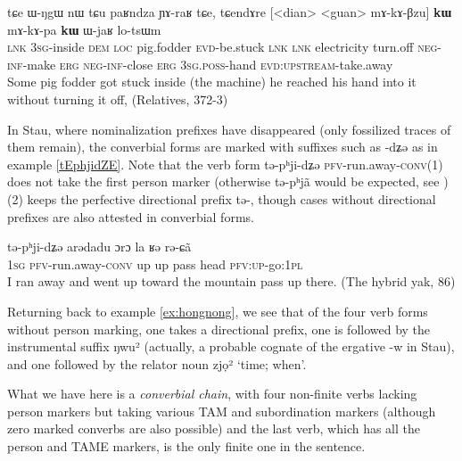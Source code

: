 \documentclass[oldfontcommands,oneside,a4paper,11pt]{article}
\newcommand{\ipa}[1]{{\phon \mbox{#1}}} %
\begin{document}
\begin{exe}
\ex \label{ex:mAkApa.kW}
\gll
\ipa{tɕe}   	\ipa{ɯ-ŋgɯ}   	\ipa{nɯ} \ipa{tɕu}   	\ipa{paʁndza}   	\ipa{ɲɤ-raʁ}   	\ipa{tɕe,}   	\ipa{tɕendɤre}   	[<dian>   	<guan>   	\ipa{mɤ-kɤ-βzu}] 	\ipa{\textbf{kɯ}}   	\ipa{mɤ-kɤ-pa}   	\ipa{\textbf{kɯ}}   	\ipa{ɯ-jaʁ}   	\ipa{lo-tsɯm}   \\
\textsc{lnk} \textsc{3sg}-inside \textsc{dem} \textsc{loc} pig.fodder \textsc{evd}-be.stuck \textsc{lnk}
\textsc{lnk} electricity turn.off \textsc{neg-inf}-make \textsc{erg}  \textsc{neg-inf}-close \textsc{erg}  \textsc{3sg.poss}-hand \textsc{evd:upstream}-take.away \\
\glt Some pig fodder got stuck inside (the machine) he reached his hand into it without turning it off, (Relatives, 372-3)
\end{exe} 

In Stau, where nominalization prefixes have disappeared (only  fossilized traces of them remain), the converbial forms are marked with suffixes such as \ipa{-dʑə} as in example \ref{tEphjidZE}. Note that the verb form \ipa{tə-pʰji-dʑə} \textsc{pfv}-run.away-\textsc{conv}(1) does not take the first person marker (otherwise \ipa{tə-pʰjã} would be expected, see \citealt{jacques14rtau}) (2) keeps the perfective directional prefix \ipa{tə-}, though cases without directional prefixes are also attested in converbial forms.

\begin{exe}
\ex \label{tEphjidZE}
\gll \ipa{ŋa} 	\ipa{tə-pʰji-dʑə} 	\ipa{arədadu} 	\ipa{ɔrɔ} 	\ipa{la} 	\ipa{ʁə} 	\ipa{rə-ɕã} \\
 \textsc{1sg} \textsc{pfv}-run.away-\textsc{conv} up up pass head \textsc{pfv:up}-go:\textsc{1pl} \\
\glt I ran away and went up toward the mountain pass up there. (The hybrid yak, 86) 
\end{exe}

Returning back to example \ref{ex:hongnong}, we see that of the four verb forms without person marking, one takes a directional prefix, one is followed by the instrumental suffix  \ipa{ŋwu²} (actually, a probable cognate of the ergative \ipa{-w} in Stau), and one followed by the relator noun  \ipa{zjọ²} `time; when'. 

What we have here is a \textit{converbial chain}, with four non-finite verbs lacking person markers but taking various TAM and subordination markers (although zero marked converbs are also possible) and the last verb, which has all the person and TAME markers, is the only finite one in the sentence.
\end{document}
